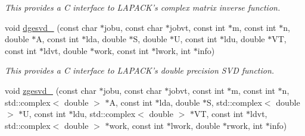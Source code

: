 \begin{DoxyCompactItemize}
\begin{DoxyCompactList}\small\item\em This provides a C interface to L\-A\-P\-A\-C\-K's complex matrix inverse function. \end{DoxyCompactList}\item 
\hypertarget{namespacekeycpp_a8fe7a71afbb6c5dc049cdd7afff6c0af}{void \hyperlink{namespacekeycpp_a8fe7a71afbb6c5dc049cdd7afff6c0af}{dgesvd\-\_\-} (const char $\ast$jobu, const char $\ast$jobvt, const int $\ast$m, const int $\ast$n, double $\ast$A, const int $\ast$lda, double $\ast$S, double $\ast$U, const int $\ast$ldu, double $\ast$V\-T, const int $\ast$ldvt, double $\ast$work, const int $\ast$lwork, int $\ast$info)}\label{namespacekeycpp_a8fe7a71afbb6c5dc049cdd7afff6c0af}

\begin{DoxyCompactList}\small\item\em This provides a C interface to L\-A\-P\-A\-C\-K's double precision S\-V\-D function. \end{DoxyCompactList}\item 
\hypertarget{namespacekeycpp_afa5e2f74110f53bd288c15ce1f183f9b}{void \hyperlink{namespacekeycpp_afa5e2f74110f53bd288c15ce1f183f9b}{zgesvd\-\_\-} (const char $\ast$jobu, const char $\ast$jobvt, const int $\ast$m, const int $\ast$n, std\-::complex$<$ double $>$ $\ast$A, const int $\ast$lda, double $\ast$S, std\-::complex$<$ double $>$ $\ast$U, const int $\ast$ldu, std\-::complex$<$ double $>$ $\ast$V\-T, const int $\ast$ldvt, std\-::complex$<$ double $>$ $\ast$work, const int $\ast$lwork, double $\ast$rwork, int $\ast$info)}\label{namespacekeycpp_afa5e2f74110f53bd288c15ce1f183f9b}


\end{DoxyCompactItemize}

